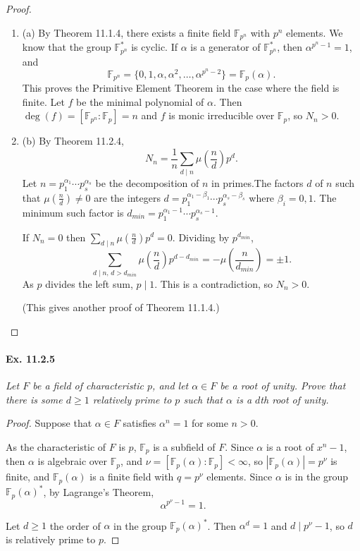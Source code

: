 \documentclass[11pt,a4paper]{article}
\newcommand{\be} {\begin{enumerate}}
\newcommand{\ee} {\end{enumerate}}
\newcommand{\F}{\mathbb{F}}
\begin{document}
\begin{proof}

\be

\item[(a)] By Theorem 11.1.4, there exists a finite field $\F_{p^n}$ with $p^n$ elements. We know that the group $\F_{p^n}^*$ is cyclic. If $\alpha$ is a generator of $\F_{p^n}^*$, then $\alpha^{p^n-1} = 1$, and
$$\F_{p^n} =\{0,1,\alpha,\alpha^2,\ldots,\alpha^{p^{n}-2}\}= \F_p(\alpha).$$ This proves the Primitive Element Theorem in the case where the field is finite. Let $f$ be the minimal polynomial of $\alpha$. Then $\deg(f) = [\F_{p^n}:\F_p] = n$ and $f$ is monic irreducible over $\F_p$, so $N_n>0$.

\item[(b)] By Theorem 11.2.4,
 $$N_n = \frac{1}{n} \sum_{d\mid n} \mu\left(\frac{n}{d}\right) p^{d}.$$
 Let $n = p_1^{\alpha_1}\cdots p_s^{\alpha_s}$ be the decomposition of $n$ in primes.The factors $d$ of $n$ such that $\mu\left(\frac{n}{d}\right) \ne 0$ are the integers $d = p_1^{\alpha_1-\beta_1} \cdots p_s^{\alpha_s-\beta_s}$ where $\beta_i = 0,1$. The minimum such factor is $d_{min} = p_1^{\alpha_1-1} \cdots p_s^{\alpha_s-1}$.
 
 If $N_n=0$ then $\sum_{d\mid n} \mu(\frac{n}{d}) p^{d} = 0$. Dividing by $p^{d_{min}}$,
 $$\sum_{d\mid n,\, d > d_{min}} \mu\left(\frac{n}{d}\right) p^{d-d_{min}}=-\mu\left(\frac{n}{d_{min}}\right)  =  \pm 1.$$
 As $p$ divides the left sum, $p\mid 1$. This is a contradiction, so $N_n >0$.
 
 (This gives another proof of Theorem 11.1.4.)
 \ee
 \end{proof}

\paragraph{Ex. 11.2.5}

{\it Let $F$ be a field of characteristic $p$, and let $\alpha \in F$ be a root of unity. Prove that there is some $d\geq 1$ relatively prime to $p$ such that $\alpha$ is a $d$th root of unity.
}

\begin{proof}
Suppose that $\alpha \in F$ satisfies $\alpha^n = 1$ for some $n>0$.

As the characteristic of $F$ is $p$, $\F_p$ is a subfield of $F$. Since $\alpha$ is a root of $x^n-1$, then $\alpha$ is algebraic over $\F_p$, and $\nu = [\F_p(\alpha) : \F_p]<\infty$, so $|\F_p(\alpha)| = p^{\nu}$ is finite, and $\F_p(\alpha)$ is a finite field with $q = p^\nu$ elements. Since $\alpha$ is in the group $\F_p(\alpha)^*$, by Lagrange's Theorem, $$\alpha^{p^\nu -1} = 1.$$

Let $d\geq 1$ the order of $\alpha$ in the group $\F_p(\alpha)^*$. Then $\alpha^d = 1$ and $d \mid p^\nu - 1$, so $d$ is relatively prime to $p$.
\end{proof}
\end{document}
